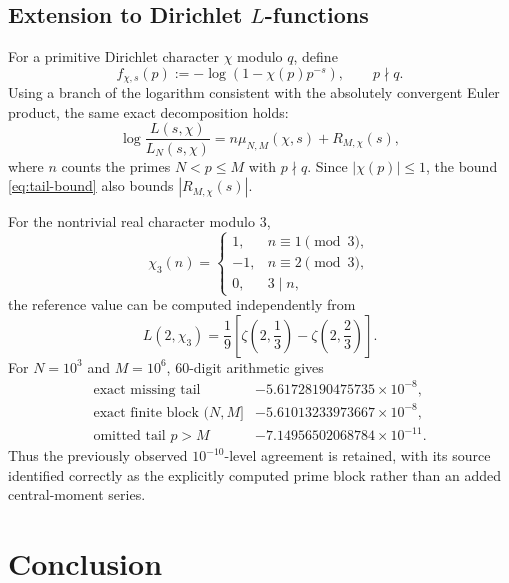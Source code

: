 \documentclass[11pt,a4paper]{article}
\begin{document}
\subsection{Extension to Dirichlet \texorpdfstring{\(L\)}{L}-functions}

For a primitive Dirichlet character \(\chi\) modulo \(q\), define
\[
  f_{\chi,s}(p):=-\log(1-\chi(p)p^{-s}),\qquad p\nmid q.
\]
Using a branch of the logarithm consistent with the absolutely
convergent Euler product, the same exact decomposition holds:
\begin{equation}\label{eq:L-tail}
  \log\frac{L(s,\chi)}{L_N(s,\chi)}
  =
  n\mu_{N,M}(\chi,s)+R_{M,\chi}(s),
\end{equation}
where \(n\) counts the primes \(N<p\le M\) with \(p\nmid q\).  Since
\(|\chi(p)|\le1\), the bound \eqref{eq:tail-bound} also bounds
\(|R_{M,\chi}(s)|\).

For the nontrivial real character modulo \(3\),
\[
  \chi_3(n)=
  \begin{cases}
    1,&n\equiv1\pmod3,\\
   -1,&n\equiv2\pmod3,\\
    0,&3\mid n,
  \end{cases}
\]
the reference value can be computed independently from
\[
  L(2,\chi_3)
  =\frac1{9}
   \left[\zeta\!\left(2,\frac13\right)
        -\zeta\!\left(2,\frac23\right)\right].
\]
For \(N=10^3\) and \(M=10^6\), 60-digit arithmetic gives
\[
\begin{array}{lr}
\text{exact missing tail} & -5.61728190475735\times10^{-8},\\
\text{exact finite block }(N,M] & -5.61013233973667\times10^{-8},\\
\text{omitted tail }p>M & -7.14956502068784\times10^{-11}.
\end{array}
\]
Thus the previously observed \(10^{-10}\)-level agreement is retained,
with its source identified correctly as the explicitly computed prime
block rather than an added central-moment series.

\section{Conclusion}
\end{document}

